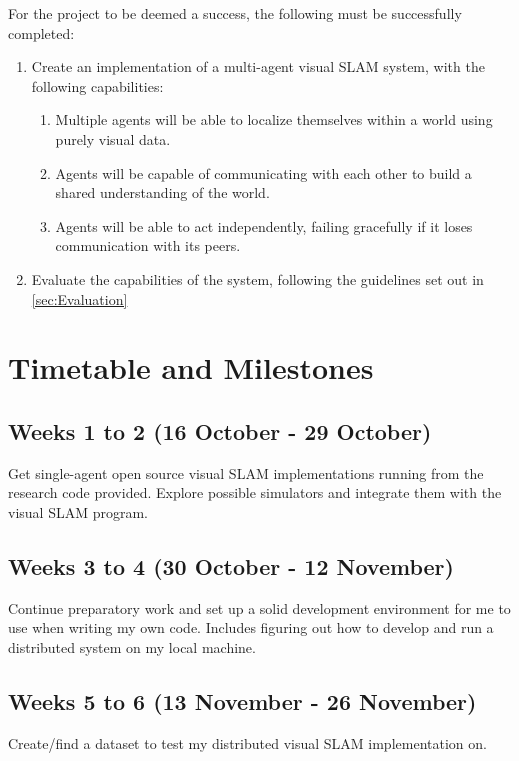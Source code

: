 \documentclass[12pt,a4paper,twoside]{article}
\begin{document}
For the project to be deemed a success, the following must be successfully completed:

\begin{enumerate}
    \item Create an implementation of a multi-agent visual SLAM system, with the following capabilities:
          \begin{enumerate}
              \item Multiple agents will be able to localize themselves within a world using purely visual data.
              \item Agents will be capable of communicating with each other to build a shared understanding of the world.
              \item Agents will be able to act independently, failing gracefully if it loses communication with its peers.
          \end{enumerate}
    \item Evaluate the capabilities of the system, following the guidelines set out in \autoref{sec:Evaluation}
\end{enumerate}

\newpage

\section{Timetable and Milestones}

\subsection*{Weeks 1 to 2 (16 October - 29 October)}
Get single-agent open source visual SLAM implementations running from the research code provided. Explore possible simulators and integrate them with the visual SLAM program.

\subsection*{Weeks 3 to 4 (30 October - 12 November)}
Continue preparatory work and set up a solid development environment for me to use when writing my own code. Includes figuring out how to develop and run a distributed system on my local machine.

\subsection*{Weeks 5 to 6 (13 November - 26 November)}
Create/find a dataset to test my distributed visual SLAM implementation on.
\end{document}

